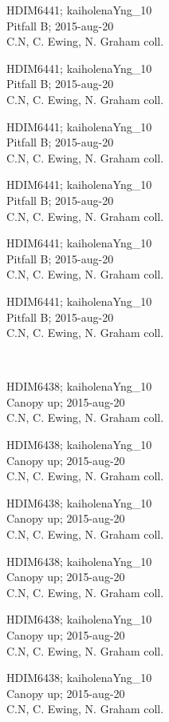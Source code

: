 \documentclass[2pt]{extarticle}
\begin{document}
\noindent
\parbox{0.16\textwidth}{\tiny \raggedright \rule[-0.3\baselineskip]{0pt}{10pt}HDIM6441; kaiholenaYng\_10\\ Pitfall B; 2015-aug-20\\ C.N, C. Ewing, N. Graham coll.}
\parbox{0.16\textwidth}{\tiny \raggedright \rule[-0.3\baselineskip]{0pt}{10pt}HDIM6441; kaiholenaYng\_10\\ Pitfall B; 2015-aug-20\\ C.N, C. Ewing, N. Graham coll.}
\parbox{0.16\textwidth}{\tiny \raggedright \rule[-0.3\baselineskip]{0pt}{10pt}HDIM6441; kaiholenaYng\_10\\ Pitfall B; 2015-aug-20\\ C.N, C. Ewing, N. Graham coll.}
\parbox{0.16\textwidth}{\tiny \raggedright \rule[-0.3\baselineskip]{0pt}{10pt}HDIM6441; kaiholenaYng\_10\\ Pitfall B; 2015-aug-20\\ C.N, C. Ewing, N. Graham coll.}
\parbox{0.16\textwidth}{\tiny \raggedright \rule[-0.3\baselineskip]{0pt}{10pt}HDIM6441; kaiholenaYng\_10\\ Pitfall B; 2015-aug-20\\ C.N, C. Ewing, N. Graham coll.}
\parbox{0.16\textwidth}{\tiny \raggedright \rule[-0.3\baselineskip]{0pt}{10pt}HDIM6441; kaiholenaYng\_10\\ Pitfall B; 2015-aug-20\\ C.N, C. Ewing, N. Graham coll.} \\ 
\vspace{0.001in} 

\noindent
\parbox{0.16\textwidth}{\tiny \raggedright \rule[-0.3\baselineskip]{0pt}{10pt}HDIM6438; kaiholenaYng\_10\\ Canopy up; 2015-aug-20\\ C.N, C. Ewing, N. Graham coll.}
\parbox{0.16\textwidth}{\tiny \raggedright \rule[-0.3\baselineskip]{0pt}{10pt}HDIM6438; kaiholenaYng\_10\\ Canopy up; 2015-aug-20\\ C.N, C. Ewing, N. Graham coll.}
\parbox{0.16\textwidth}{\tiny \raggedright \rule[-0.3\baselineskip]{0pt}{10pt}HDIM6438; kaiholenaYng\_10\\ Canopy up; 2015-aug-20\\ C.N, C. Ewing, N. Graham coll.}
\parbox{0.16\textwidth}{\tiny \raggedright \rule[-0.3\baselineskip]{0pt}{10pt}HDIM6438; kaiholenaYng\_10\\ Canopy up; 2015-aug-20\\ C.N, C. Ewing, N. Graham coll.}
\parbox{0.16\textwidth}{\tiny \raggedright \rule[-0.3\baselineskip]{0pt}{10pt}HDIM6438; kaiholenaYng\_10\\ Canopy up; 2015-aug-20\\ C.N, C. Ewing, N. Graham coll.}
\parbox{0.16\textwidth}{\tiny \raggedright \rule[-0.3\baselineskip]{0pt}{10pt}HDIM6438; kaiholenaYng\_10\\ Canopy up; 2015-aug-20\\ C.N, C. Ewing, N. Graham coll.} \\ 
\vspace{0.001in} 
\end{document}

